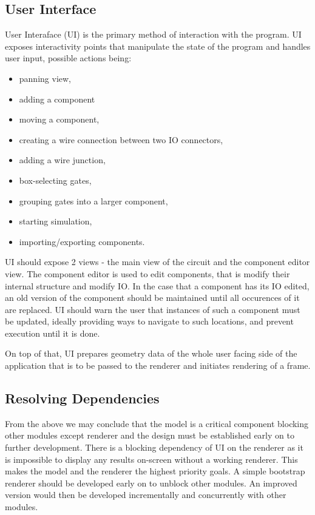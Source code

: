 \documentclass[12pt, a4paper]{article}
\newenvironment{itemlist}
{
  \vspace{-0.5\topsep}
  \begin{itemize}
    \setlength{\itemsep}{4pt}
    \setlength{\parskip}{0pt}
} {
  \end{itemize}
  \vspace{-0.5\topsep}
}
\begin{document}
\subsection{User Interface}
User Interaface (UI) is the primary method of interaction with the program. UI
exposes interactivity points that manipulate the state of the program and
handles user input, possible actions being:
\begin{itemlist}
  \item panning view,
  \item adding a component
  \item moving a component,
  \item creating a wire connection between two IO connectors,
  \item adding a wire junction,
  \item box-selecting gates,
  \item grouping gates into a larger component,
  \item starting simulation,
  \item importing/exporting components.
\end{itemlist}
UI should expose 2 views - the main view of the circuit and the component editor
view. The component editor is used to edit components, that is modify their
internal structure and modify IO. In the case that a component has its IO
edited, an old version of the component should be maintained until all
occurences of it are replaced. UI should warn the user that instances of such a
component must be updated, ideally providing ways to navigate to such locations,
and prevent execution until it is done.

On top of that, UI prepares geometry data of the whole user facing side of the
application that is to be passed to the renderer and initiates rendering of a
frame.

\subsection{Resolving Dependencies}
From the above we may conclude that the model is a critical component blocking
other modules except renderer and the design must be established early on to
further development. There is a blocking dependency of UI on the renderer as it
is impossible to display any results on-screen without a working renderer. This
makes the model and the renderer the highest priority goals. A simple bootstrap
renderer should be developed early on to unblock other modules. An improved
version would then be developed incrementally and concurrently with other
modules.
\end{document}
